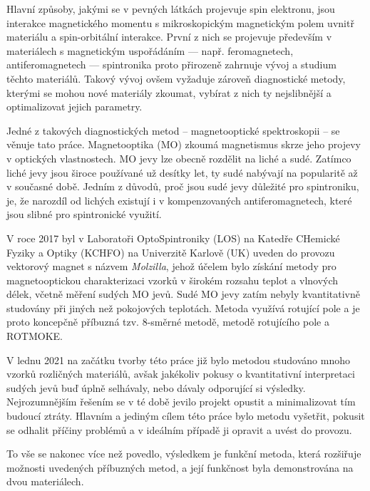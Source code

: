 Hlavní způsoby, jakými se v pevných látkách projevuje spin elektronu, jsou interakce magnetického momentu s mikroskopickým magnetickým polem uvnitř materiálu a spin-orbitální interakce.
První z nich se projevuje především v materiálech s magnetickým uspořádáním --- např. feromagnetech, antiferomagnetech --- spintronika proto přirozeně zahrnuje vývoj a studium těchto materiálů.
Takový vývoj ovšem vyžaduje zároveň diagnostické metody, kterými se mohou nové materiály zkoumat, vybírat z nich ty nejslibnější a optimalizovat jejich parametry.

Jedné z takových diagnostických metod -- magnetooptické spektroskopii -- se věnuje tato práce.
Magnetooptika (MO) zkoumá magnetismus skrze jeho projevy v optických vlastnostech.
MO jevy lze obecně rozdělit na liché a sudé.
Zatímco liché jevy jsou široce používané už desítky let, ty sudé nabývají na popularitě až v současné době.
Jedním z důvodů, proč jsou sudé jevy důležité pro spintroniku, je, že narozdíl od lichých existují i v kompenzovaných antiferomagnetech, které jsou slibné pro spintronické využití.

V roce 2017 byl v Laboratoři OptoSpintroniky (LOS) na Katedře CHemické Fyziky a Optiky (KCHFO) na Univerzitě Karlově (UK) uveden do provozu vektorový magnet s názvem \emph{Molzilla}, jehož účelem bylo získání metody pro magnetooptickou charakterizaci vzorků v širokém rozsahu teplot a vlnových délek, včetně měření sudých MO jevů.
Sudé MO jevy zatím nebyly kvantitativně studovány při jiných než pokojových teplotách.
Metoda využívá rotující pole a je proto koncepčně příbuzná tzv. 8-směrné metodě, metodě rotujícího pole a ROTMOKE.

V lednu 2021 na začátku tvorby této práce již bylo metodou studováno mnoho vzorků rozličných materiálů, avšak jakékoliv pokusy o kvantitativní interpretaci sudých jevů buď úplně selhávaly, nebo dávaly odporující si výsledky.
Nejrozumnějším řešením se v té době jevilo projekt opustit a minimalizovat tím budoucí ztráty.
Hlavním a jediným cílem této práce bylo metodu vyšetřit, pokusit se odhalit příčiny problémů a v ideálním případě ji opravit a uvést do provozu.

To vše se nakonec více než povedlo, výsledkem je funkční metoda, která rozšiřuje možnosti uvedených příbuzných metod, a její funkčnost byla demonstrována na dvou materiálech.
